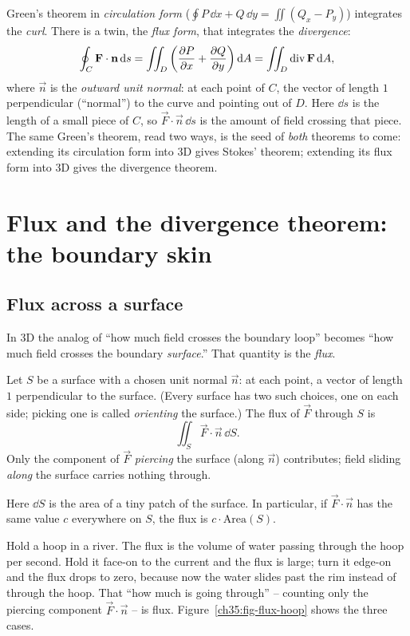 \begin{aestheticbox}
Green's theorem in \emph{circulation form}
($\oint P\,\dd x+Q\,\dd y = \iint (Q_x-P_y)$) integrates the \emph{curl}. There is
a twin, the \emph{flux form}, that integrates the \emph{divergence}:
\[
  \oint_C \mathbf{F}\cdot \mathbf{n}\,\mathrm{d} s = \iint_D \left(\frac{\partial P}{\partial x}+\frac{\partial Q}{\partial y}\right)\mathrm{d} A
  = \iint_D \operatorname{div}\mathbf{F}\,\mathrm{d} A,
\]
where $\vec n$ is the \emph{outward unit normal}: at each point of $C$, the vector
of length $1$ perpendicular (``normal'') to the curve and pointing out of $D$. Here
$\dd s$ is the length of a small piece of $C$, so $\vec F\cdot\vec n\,\dd s$ is the
amount of field crossing that piece. The same Green's theorem, read two ways,
is the seed of \emph{both} theorems to come: extending its circulation form into
3D gives Stokes' theorem; extending its flux form into 3D gives the divergence
theorem.
\end{aestheticbox}

\section{Flux and the divergence theorem: the boundary skin}
\label{ch35:divthm}

\subsection{Flux across a surface}

In 3D the analog of ``how much field crosses the boundary loop'' becomes ``how much
field crosses the boundary \emph{surface}.'' That quantity is the \emph{flux}.

\begin{definition}
\label{ch35:def-flux}
Let $S$ be a surface with a chosen unit normal $\vec n$: at each point, a vector
of length $1$ perpendicular to the surface. (Every surface has two such choices,
one on each side; picking one is called \emph{orienting} the surface.) The flux of
$\vec F$ through $S$ is
\[
  \iint_S \vec F\cdot\vec n\,\dd S.
\]
Only the component of $\vec F$ \emph{piercing} the surface (along $\vec n$)
contributes; field sliding \emph{along} the surface carries nothing through.
\end{definition}

Here $\dd S$ is the area of a tiny patch of the surface. In particular, if
$\vec F\cdot\vec n$ has the same value $c$ everywhere on $S$, the flux is
$c\cdot\text{Area}(S)$.

\begin{intuitionbox}
Hold a hoop in a river. The flux is the volume of water passing through the hoop
per second. Hold it face-on to the current and the flux is large; turn it edge-on
and the flux drops to zero, because now the water slides past the rim instead of
through the hoop. That ``how much is going through'' -- counting only the piercing
component $\vec F\cdot\vec n$ -- is flux. Figure~\ref{ch35:fig-flux-hoop} shows the
three cases.
\end{intuitionbox}

